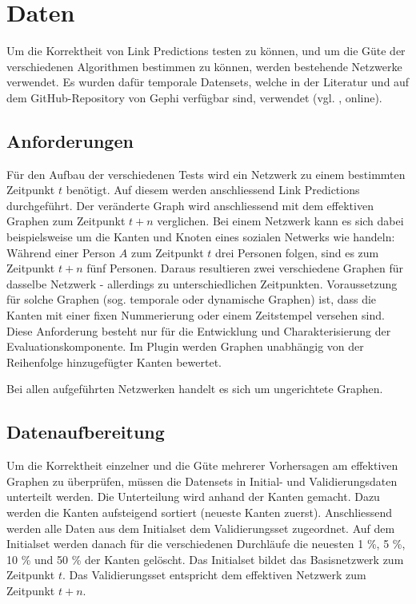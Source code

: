 \chapter{Daten}
\label{daten}
Um die Korrektheit von Link Predictions testen zu können, und um die Güte der verschiedenen Algorithmen bestimmen zu können, werden bestehende Netzwerke verwendet.
Es wurden dafür temporale Datensets, welche in der Literatur und auf dem GitHub-Repository von Gephi verfügbar sind, verwendet (vgl. \citeauthor{moll_datasets_2018} \citeyear{moll_datasets_2018}, online).

\section{Anforderungen}
Für den Aufbau der verschiedenen Tests wird ein Netzwerk zu einem bestimmten Zeitpunkt $t$ benötigt.
Auf diesem werden anschliessend Link Predictions durchgeführt.
Der veränderte Graph wird anschliessend mit dem effektiven Graphen zum Zeitpunkt $t + n$ verglichen.
Bei einem Netzwerk kann es sich dabei beispielsweise um die Kanten und Knoten eines sozialen Netwerks wie  handeln:
Während einer Person $A$ zum Zeitpunkt $t$ drei Personen folgen, sind es zum Zeitpunkt $t + n$ fünf Personen.
Daraus resultieren zwei verschiedene Graphen für dasselbe Netzwerk - allerdings zu unterschiedlichen Zeitpunkten.
Voraussetzung für solche Graphen (sog. temporale oder dynamische Graphen) ist, dass die Kanten mit einer fixen Nummerierung oder einem Zeitstempel versehen sind.
Diese Anforderung besteht nur für die Entwicklung und Charakterisierung der Evaluationskomponente.
Im Plugin werden Graphen unabhängig von der Reihenfolge hinzugefügter Kanten bewertet.

Bei allen aufgeführten Netzwerken handelt es sich um ungerichtete Graphen.

\section{Datenaufbereitung}
Um die Korrektheit einzelner und die Güte mehrerer Vorhersagen am effektiven Graphen zu überprüfen, müssen die Datensets in Initial- und Validierungsdaten unterteilt werden.
Die Unterteilung wird anhand der Kanten gemacht. Dazu werden die Kanten aufsteigend sortiert (neueste Kanten zuerst).
Anschliessend werden alle Daten aus dem Initialset dem Validierungsset zugeordnet. Auf dem Initialset werden danach für die verschiedenen Durchläufe die neuesten 1 \%, 5 \%, 10 \% und 50 \% der Kanten gelöscht. Das Initialset bildet das Basisnetzwerk zum Zeitpunkt $t$.
Das Validierungsset entspricht dem effektiven Netzwerk zum Zeitpunkt $t + n$.

